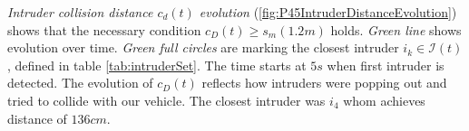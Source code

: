 \noindent \emph{Intruder collision distance $c_d(t)$ evolution} (\ref{fig:P45IntruderDistanceEvolution}) shows that the necessary condition $c_D(t)\ge s_m (1.2 m)$ holds. \emph{Green line} shows evolution over time. \emph{Green full circles} are marking the closest intruder $i_k\in\mathscr{I}(t)$, defined in table \ref{tab:intruderSet}. The time starts at $5s$ when first intruder is detected. The evolution of $c_D(t)$ reflects how intruders were popping out and tried to collide with our vehicle. The closest intruder was $i_4$ whom achieves distance of $136 cm$.
